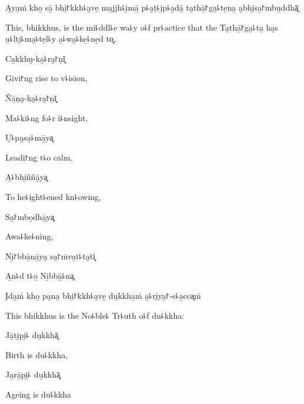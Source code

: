 A̮ya̱ṁ kho̱ sā̱ bhi̱꜓kkh꜕a̮ve̱ ma̱jjh꜕i̮mā̱ p꜕a̮ṭ꜕i̮p꜕a̮dā̱ ta̮thā̱꜓ga̮꜕te̱na̮ a̮bhi̮sa̱꜓mbu̱ddhā͓

\begin{english}
  This, bhikkhus, is the mi꜕ddl꜕e wa꜕y o꜕f pr꜕actice that the
  Ta̮thā̱꜓ga̮꜕ta̮ ha̱s u̱꜕lti̮꜕ma̮꜕te̱l꜕y a̱꜕wa̮꜕ke̱꜕ne̱d to͓,
\end{english}

Ca̱kkhu̮-ka̮꜕ra̮꜓ṇī͓

\begin{english}
  Givi꜓ng rise to v꜕ision,
\end{english}

Ñā̱ṇa̮-ka̮꜕ra̮꜓ṇī͓

\begin{english}
  Ma꜕ki꜕ng fo꜕r i꜕nsight,
\end{english}

U̮꜕pa̮sa̮꜕mā̱ya͓

\begin{english}
  Leadi꜓ng t꜕o calm,
\end{english}

A̮꜕bhi̱ññā̱ya͓

\begin{english}
  To he꜕ight꜕ened kn꜕owing,
\end{english}

Sa̱꜓mbo̱dhā̱ya͓

\begin{english}
  Awa꜕ke꜕ning,
\end{english}

Ni̱꜓bbā̱nā̱ya̮ sa̱꜓ṁva̱t꜕ta̮ti͓

\begin{english}
  A̱n꜕d t꜕o̱ Ni̱bbā̱꜕na͓.
\end{english}

I̮da̱ṁ kho̱ pa̮na̮ bhi̱꜓kkh꜕a̮ve̱ du̱kkha̱ṁ a̮꜕ri̮ya̮꜓-s꜕a̱cca͓ṁ

\begin{english}
  This bhikkhus is the No꜕ble꜕ Tr꜕uth o꜕f du꜕kkha:
\end{english}

Jā̱ti̮pi̮꜕ du̱kkhā͓

\begin{english}
  Birth is du꜕kkha,
\end{english}

Ja̮rā̱pi̮꜕ du̱kkhā͓

\begin{english}
  Ageing is du꜕kkha
\end{english}

